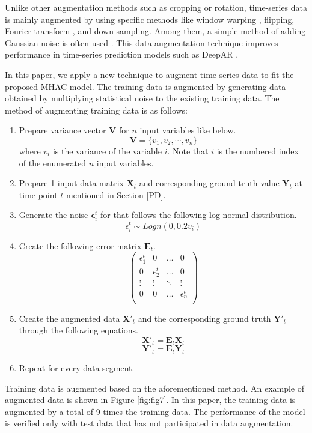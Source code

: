 \documentclass[conference]{IEEEtran}
\begin{document}
Unlike other augmentation methods such as cropping or rotation, time-series data is mainly augmented by using specific methods like window warping \cite{cui2016multi}, flipping, Fourier transform \cite{steven2018feature}, and down-sampling. Among them, a simple method of adding Gaussian noise is often used \cite{wen2020time}. This data augmentation technique improves performance in time-series prediction models such as DeepAR \cite{salinas2020deepar}. 

In this paper, we apply a new technique to augment time-series data to fit the proposed MHAC model. The training data is augmented by generating data obtained by multiplying statistical noise to the existing training data. The method of augmenting training data is as follows:

\begin{enumerate}
  \item Prepare variance vector \(\mathbf{V}\) for \(n\) input variables like below.
  \[\mathbf{V} = \{v_1, v_2, \cdots, v_n\}\]
  where \(v_i\) is the variance of the variable \(i\). Note that \(i\) is the numbered index of the enumerated \(n\) input variables.
  \item Prepare 1 input data matrix \(\mathbf{X}_t\) and corresponding ground-truth value \(\mathbf{Y}_t\) at time point \(t\) mentioned in Section \ref{PD}.
  \item Generate the noise \(\mathbf{\epsilon}^t_i\) for that follows the following log-normal distribution.
  \[\epsilon^t_i \sim Logn(0, 0.2 v_i)\]
  \item Create the following error matrix \(\mathbf{E}_t\).
  \[\begin{pmatrix}
  \epsilon^t_1 & 0 & \dots & 0\\
  0 & \epsilon^t_2 & \dots & 0\\
  \vdots & \vdots & \ddots & \vdots\\
  0 & 0 & \dots & \epsilon^t_n \\
  \end{pmatrix}\]
  \item Create the augmented data \(\mathbf{X}'_t\) and the corresponding ground truth \(\mathbf{Y}'_t\) through the following equations.
  \[\mathbf{X}'_t = \mathbf{E}_t\mathbf{X}_t\]
  \[\mathbf{Y}'_t = \mathbf{E}_t\mathbf{Y}_t\]
  \item Repeat for every data segment.
\end{enumerate}

Training data is augmented based on the aforementioned method. An example of augmented data is shown in Figure \ref{fig:fig7}. In this paper, the training data is augmented by a total of 9 times the training data. The performance of the model is verified only with test data that has not participated in data augmentation.
\end{document}
